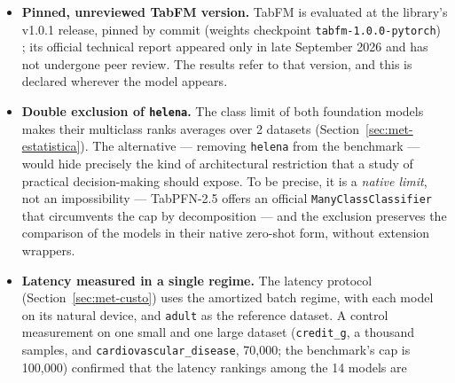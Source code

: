 \begin{itemize}
    technical report declares \emph{exclusively synthetic}
    pre-training --- tables sampled from structural causal models
    with randomized functional dependencies \citep{kong2026} ---
    which rules out by construction direct contamination by OpenML
    datasets (checked at the primary source on 2026-10-05) ---
    unlike, as seen, the default TabPFN classifier checkpoint. The
    weaker, unaddressable risk remains: priors designed by teams
    that know the public benchmarks. We treat this residual risk
    with three safeguards: it is declared here and revisited in the
    interpretation of the results; conclusions about foundation
    models are stated at the regime level (consistency across
    datasets), not at the individual-cell level; and the cost axis
    --- immune to contamination --- takes part in every practical
    conclusion.
  \item \textbf{Pinned, unreviewed TabFM version.} TabFM is
    evaluated at the library's v1.0.1 release, pinned by commit
    (weights checkpoint \texttt{tabfm-1.0.0-pytorch})
    \citep{tabfm2026}; its official technical report
    \citep{kong2026} appeared only in late September 2026 and has
    not undergone peer review. The results refer to that version,
    and this is declared wherever the model appears.
  \item \textbf{Double exclusion of \texttt{helena}.} The class
    limit of both foundation models makes their multiclass ranks
    averages over 2 datasets (Section~\ref{sec:met-estatistica}).
    The alternative --- removing \texttt{helena} from the benchmark
    --- would hide precisely the kind of architectural restriction
    that a study of practical decision-making should expose. To be
    precise, it is a \emph{native limit}, not an
    impossibility --- TabPFN-2.5 offers an official
    \texttt{ManyClassClassifier} that circumvents the cap by
    decomposition --- and the exclusion preserves the comparison of
    the models in their native zero-shot form, without extension
    wrappers.
  \item \textbf{Latency measured in a single regime.} The latency
    protocol (Section~\ref{sec:met-custo}) uses the amortized batch
    regime, with each model on its natural device, and
    \texttt{adult} as the reference dataset. A control measurement
    on one small and one large dataset (\texttt{credit\_g}, a
    thousand samples, and
    \texttt{cardiovascular\_\allowbreak disease}, 70{,}000; the
    benchmark's cap is 100{,}000)
    confirmed that the latency rankings among the 14 models are

\end{itemize}
